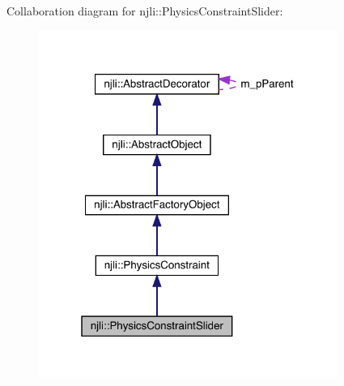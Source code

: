 Collaboration diagram for njli\+:\+:Physics\+Constraint\+Slider\+:\nopagebreak
\begin{figure}[H]
\begin{center}
\leavevmode
\includegraphics[width=277pt]{classnjli_1_1_physics_constraint_slider__coll__graph}
\end{center}
\end{figure}
